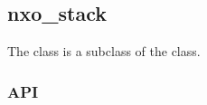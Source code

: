 %
%
%
%
%              

\subsection{nxo\_stack}
\label{nxo_stack}

The  class is a subclass of the  class.

\subsubsection{API}
